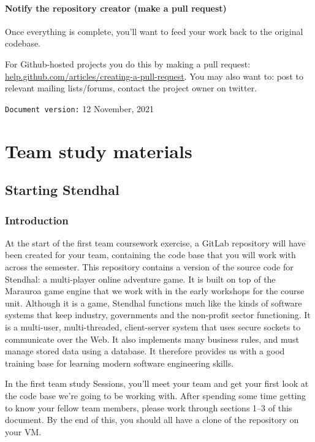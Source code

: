 \documentclass[
]{book}
\begin{document}
\hypertarget{pullrequest}{%
\subsection{Notify the repository creator (make a pull request)}\label{pullrequest}}

Once everything is complete, you'll want to feed your work back to the original codebase.

For Github-hosted projects you do this by making a pull request: \href{https://help.github.com/articles/creating-a-pull-request}{help.github.com/articles/creating-a-pull-request}. You may also want to: post to relevant mailing lists/forums, contact the project owner on twitter.

\texttt{Document\ version:} 12 November, 2021

\hypertarget{part-team-study-materials}{%
\part{Team study materials}\label{part-team-study-materials}}

\hypertarget{starting}{%
\chapter{Starting Stendhal}\label{starting}}

\hypertarget{introduction-2}{%
\section{Introduction}\label{introduction-2}}

At the start of the first team coursework exercise, a GitLab repository will have been created for your team, containing the code base that you will work with across the semester. This repository contains a version of the source code for Stendhal: a multi-player online adventure game. It is built on top of the Marauroa game engine that we work with in the early workshops for the course unit. Although it is a game, Stendhal functions much like the kinds of software systems that keep industry, governments and the non-profit sector functioning. It is a multi-user, multi-threaded, client-server system that uses secure sockets to communicate over the Web. It also implements many business rules, and must manage stored data using a database. It therefore provides us with a good training base for learning modern software engineering skills.

In the first team study Sessions, you'll meet your team and get your first look at the code base we're going to be working with. After spending some time getting to know your fellow team members, please work through sections 1--3 of this document. By the end of this, you should all have a clone of the repository on your VM.
\end{document}
